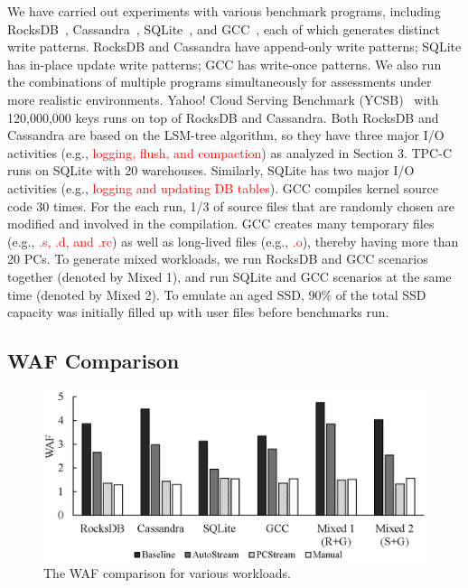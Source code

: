 We have carried out experiments with various benchmark programs, including
RocksDB~\cite{RocksDB}, Cassandra~\cite{Cassandra}, 
SQLite~\cite{SQLite}, and GCC~\cite{GCC}, each of
which generates distinct write patterns.  RocksDB and Cassandra have
append-only write patterns; SQLite has in-place update write patterns; GCC has
write-once patterns.  We also run the combinations of multiple programs
simultaneously for assessments under more realistic environments.  Yahoo! Cloud
Serving Benchmark (YCSB)~\cite{YCSB} with 120,000,000 keys runs on top of
RocksDB and Cassandra.  Both RocksDB and Cassandra are based on the LSM-tree
algorithm, so they have three major I/O activities (e.g.,
\textcolor{red}{logging, flush, and compaction}) as analyzed in Section 3.
TPC-C~\cite{TPCC} runs on SQLite with 20 warehouses.  Similarly, SQLite has two
major I/O activities (e.g., \textcolor{red}{logging and updating DB tables}). 
GCC compiles kernel source code 30 times. For the each run, 1/3 of source files
that are randomly chosen are modified and involved in the compilation.  GCC
creates many temporary files (e.g., \textcolor{red}{.s, .d, and .rc}) as well as long-lived
files (e.g., \textcolor{red}{.o}), thereby having more than 20 PCs.  To
generate mixed workloads, we run RocksDB and GCC scenarios together (denoted by
Mixed 1), and run SQLite and GCC scenarios at the same time (denoted by Mixed
2).
To emulate an aged SSD, 90\% of the total SSD capacity was initially filled up
with user files before benchmarks run.


\subsection{WAF Comparison}

\begin{figure}[t]
	\centering
	\includegraphics[width=0.9\linewidth]{figure/waf}
	\caption{The WAF comparison for various workloads.}
	\label{fig:waf}
\end{figure}

